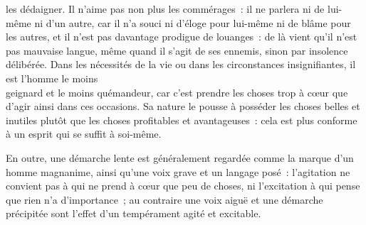 \documentclass[french,twoside]{book} %
\begin{document}
les dédaigner. Il n’aime pas non plus les commérages : il ne parlera ni de lui-même ni d’un autre, car il n’a souci ni d’éloge pour lui-même ni de blâme pour les autres, et il n’est pas davantage prodigue de louanges : de là vient qu’il n’est pas mauvaise langue, même quand il s’agit de ses ennemis, sinon par insolence délibérée. Dans les nécessités de la vie ou dans les circonstances insignifiantes, il est l’homme le moins \\
geignard et le moins quémandeur, car c’est prendre les choses trop à cœur que d’agir ainsi dans ces occasions. Sa nature le pousse à posséder les choses belles et inutiles plutôt que les choses profitables et avantageuses : cela est plus conforme à un esprit qui se suffit à soi-même.\par
En outre, une démarche lente est généralement regardée comme la marque d’un homme magnanime, ainsi qu’une voix grave et un langage posé : l’agitation ne convient pas à qui ne prend à cœur que peu de choses, ni l’excitation à qui pense \\
que rien n’a d’importance ; au contraire une voix aiguë et une démarche précipitée sont l’effet d’un tempérament agité et excitable.
\end{document}

